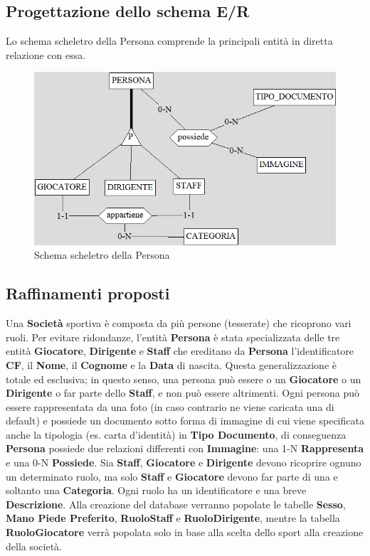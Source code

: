 \documentclass[a4paper,12pt]{report}
\begin{document}
\subsection{Progettazione dello schema E/R}
Lo schema scheletro della Persona comprende la principali entità in diretta relazione con essa.
\begin{figure}[htp]
    \centering
    \includegraphics[width = \textwidth]{GSS_report/img/persona.png}
    \caption{Schema scheletro della Persona}
\end{figure}
\subsection{Raffinamenti proposti}

Una \textbf{Società} sportiva è composta da più persone (tesserate) che ricoprono vari ruoli.
Per evitare ridondanze, l'entità \textbf{Persona} è stata specializzata delle tre entità \textbf{Giocatore}, \textbf{Dirigente} e \textbf{Staff} che ereditano da \textbf{Persona} l'identificatore  \textbf{CF}, il \textbf{Nome}, il \textbf{Cognome} e la \textbf{Data} di nascita.
Questa generalizzazione è totale ed esclusiva; in questo senso, una persona può essere o un \textbf{Giocatore} o un \textbf{Dirigente} o far parte dello \textbf{Staff}, e non può essere altrimenti. \newline \newline
Ogni persona può essere rappresentata da una foto (in caso contrario ne viene caricata una di default) e possiede un documento sotto forma di immagine di cui viene specificata anche la tipologia (es. carta d'identità) in \textbf{Tipo Documento}, di conseguenza \textbf{Persona} possiede due relazioni differenti con \textbf{Immagine}: una 1-N \textbf{Rappresenta} e una 0-N \textbf{Possiede}. \newline \newline
Sia \textbf{Staff}, \textbf{Giocatore} e \textbf{Dirigente} devono ricoprire ognuno un determinato ruolo, ma solo \textbf{Staff} e \textbf{Giocatore} devono far parte di una e soltanto una \textbf{Categoria}. Ogni ruolo ha un identificatore e una breve \textbf{Descrizione}.
Alla creazione del database verranno popolate le tabelle \textbf{Sesso}, \textbf{Mano Piede Preferito}, \textbf{RuoloStaff} e \textbf{RuoloDirigente}, mentre la tabella \textbf{RuoloGiocatore} verrà popolata solo in base alla scelta dello sport alla creazione della società.
\end{document}
